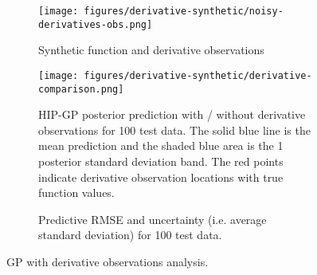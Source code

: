 \begin{figure}[t!]
\centering
\begin{subfigure}{\columnwidth}
  \texttt{[image: figures/derivative-synthetic/noisy-derivatives-obs.png]}
  \caption{Synthetic function and derivative observations}
	\label{fig:derivative-observations}
  \vspace{0.25cm}
\end{subfigure}
\begin{subfigure}{\columnwidth}
  \texttt{[image: figures/derivative-synthetic/derivative-comparison.png]}
  \caption{HIP-GP posterior prediction with / without derivative observations for 100 test data.
  The solid blue line is the mean prediction
  and the shaded blue area is the 1 posterior standard deviation band.
  The red points indicate derivative observation locations with true function values.}
	\label{fig:comparison-derivative}
  \vspace{0.25cm}
\end{subfigure}
\begin{subfigure}{\columnwidth}
  \centering
  \scalebox{.8}{
  
  }
	\caption{Predictive RMSE and uncertainty (i.e. average standard deviation) for 100 test data.}
	\label{tab:derivative-result}
\end{subfigure}
\caption{GP with derivative observations analysis.}
\label{fig:derivative-gp}
\end{figure}
